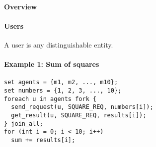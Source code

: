 \documentclass{memo}
\begin{document}
\small


\paragraph{Overview}

\paragraph{Users}
A user is any distinguishable entity. 


\paragraph{Example 1: Sum of squares}
\begin{verbatim}
set agents = {m1, m2, ..., m10};
set numbers = {1, 2, 3, ..., 10};
foreach u in agents fork {
  send_request(u, SQUARE_REQ, numbers[i]);
  get_result(u, SQUARE_REQ, results[i]);
} join_all;
for (int i = 0; i < 10; i++)
  sum += results[i];
\end{verbatim}
\end{document}
